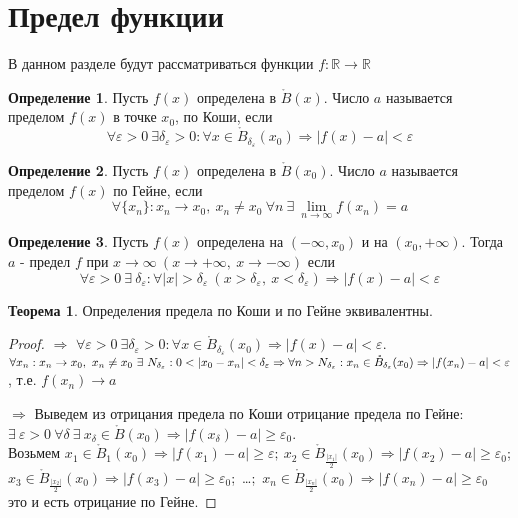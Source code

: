 \documentclass[a4paper, 12pt]{article}
\newcommand{\R}{\mathbb{R}}
\newcommand{\Bo}{\mathring{B}}
\renewcommand{\epsilon}{\varepsilon}
\newcommand\tab[1][.5cm]{\hspace*{#1}}
\newcommand{\lims}{\lim\limits_{n\to \infty}}
\theoremstyle{definition}
\newtheorem*{definition}{Определение}
\newtheorem*{theorem}{Теорема}
\begin{document}
    \section{Предел функции}
        В данном разделе будут рассматриваться функции $f: \R\to\R$
        \begin{definition}
            Пусть $f(x)$ определена в $\Bo (x)$. Число $a$ называется пределом $f(x)$ в точке $x_0$, по Коши, если  
            \[\forall \epsilon>0\ \exists \delta_{\epsilon}>0: \forall x\in \Bo_{\delta_{\epsilon}}(x_0) \Rightarrow |f(x)-a|<\epsilon\]
        \end{definition} 
        \begin{definition}
            Пусть $f(x)$ определена в $\Bo(x_0)$. Число $a$ называется пределом $f(x)$ по Гейне, если
            \[\forall \{x_n\}: x_n\to x_0,\ x_n\ne x_0\ \forall n\ \exists\ \lims f(x_n)=a\]
        \end{definition} 
        \begin{definition}
            Пусть $f(x)$ определена на $(-\infty, x_0)$ и на $(x_0, +\infty)$. Тогда $a$ - предел $f$ при $x\to \infty\ (x\to +\infty,\ x\to -\infty)$ если 
            \[\forall \epsilon>0\ \exists\ \delta_{\epsilon}: \forall |x|>\delta_{\epsilon}\ (x>\delta_{\epsilon},\ x<\delta_{\epsilon}) \Rightarrow |f(x)-a|<\epsilon\]
        \end{definition} 
        \begin{theorem} 
            Определения предела по Коши и по Гейне эквивалентны.
        \end{theorem} 
        \begin{proof}\tab
                \item[\text{(К)}$\Rightarrow$\text{(Г):}] $\forall \epsilon>0\ \exists \delta_{\epsilon}>0: \forall x\in \Bo_{\delta_{\epsilon}}(x_0) \Rightarrow |f(x)-a|<\epsilon$.\\
                $\forall x_n: x_n\to x_0,\ x_n\ne x_0\ \exists\ N_{\delta_{\epsilon}}: 0<|x_0-x_n|<\delta_{\epsilon} \Rightarrow \forall n> N_{\delta_{\epsilon}}: x_n\in \Bo_{\delta_{\epsilon}}(x_0)\\
                \Rightarrow |f(x_n)-a|<\epsilon$, т.е. $f(x_n)\to a$    
                \item[\text{(Г)}$\Rightarrow$\text{(К):}] Выведем из отрицания предела по Коши отрицание предела по Гейне:\\
                $\exists\ \epsilon> 0\ \forall \delta\ \exists\ x_{\delta}\in \Bo(x_0) \Rightarrow |f(x_{\delta})-a|\geq \epsilon_0$.\\
                Возьмем $x_1 \in \Bo_1(x_0) \Rightarrow |f(x_1)-a|\geq \epsilon;\ x_2 \in \Bo_{\frac{|x_1|}{2}}(x_0) \Rightarrow |f(x_2)-a|\geq \epsilon_0$;\\
                $x_3\in \Bo_{\frac{|x_2|}{2}}(x_0) \Rightarrow |f(x_3)-a|\geq \epsilon_0$;\ \dots;\ $x_n \in \Bo_{\frac{|x_n|}{2}}(x_0) \Rightarrow |f(x_n)-a|\geq \epsilon_0$\\
                это и есть отрицание по Гейне.
        \end{proof} 
\end{document}

